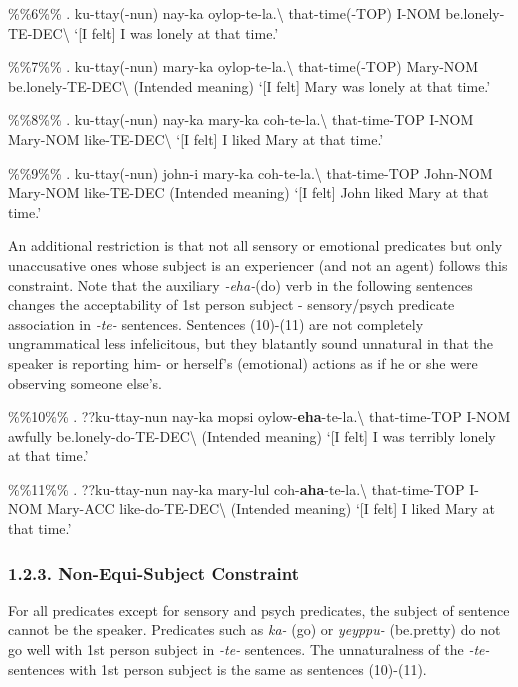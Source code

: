 \%\%6\%\% \ex. \gll ku-ttay(-nun) nay-ka oylop-te-la.\textbackslash{}
that-time(-TOP) I-NOM be.lonely-TE-DEC\textbackslash{} `{[}I felt{]} I
was lonely at that time.'

\%\%7\%\% \ex. \gll *ku-ttay(-nun) mary-ka oylop-te-la.\textbackslash{}
that-time(-TOP) Mary-NOM be.lonely-TE-DEC\textbackslash{} (Intended
meaning) `{[}I felt{]} Mary was lonely at that time.'

\%\%8\%\% \ex. ku-ttay(-nun) nay-ka mary-ka coh-te-la.\textbackslash{}
that-time-TOP I-NOM Mary-NOM like-TE-DEC\textbackslash{} `{[}I felt{]} I
liked Mary at that time.'

\%\%9\%\% \ex. \gll *ku-ttay(-nun) john-i mary-ka
coh-te-la.\textbackslash{} that-time-TOP John-NOM Mary-NOM like-TE-DEC
(Intended meaning) `{[}I felt{]} John liked Mary at that time.'

An additional restriction is that not all sensory or emotional
predicates but only unaccusative ones whose subject is an experiencer
(and not an agent) follows this constraint. Note that the auxiliary
\emph{-eha-}(do) verb in the following sentences changes the
acceptability of 1st person subject - sensory/psych predicate
association in \emph{-te-} sentences. Sentences (10)-(11) are not
completely ungrammatical less infelicitous, but they blatantly sound
unnatural in that the speaker is reporting him- or herself's (emotional)
actions as if he or she were observing someone else's.

\%\%10\%\% \ex. \gll ??ku-ttay-nun nay-ka mopsi
oylow-\textbf{eha}-te-la.\textbackslash{} that-time-TOP I-NOM awfully
be.lonely-do-TE-DEC\textbackslash{} (Intended meaning) `{[}I felt{]} I
was terribly lonely at that time.'

\%\%11\%\% \ex. \gll ??ku-ttay-nun nay-ka mary-lul
coh-\textbf{aha}-te-la.\textbackslash{} that-time-TOP I-NOM Mary-ACC
like-do-TE-DEC\textbackslash{} (Intended meaning) `{[}I felt{]} I liked
Mary at that time.'

\hypertarget{non-equi-subject-constraint}{%
\subsubsection{1.2.3. Non-Equi-Subject
Constraint}\label{non-equi-subject-constraint}}

For all predicates except for sensory and psych predicates, the subject
of sentence cannot be the speaker. Predicates such as \emph{ka-} (go) or
\emph{yeyppu-} (be.pretty) do not go well with 1st person subject in
\emph{-te-} sentences. The unnaturalness of the \emph{-te-} sentences
with 1st person subject is the same as sentences (10)-(11).

